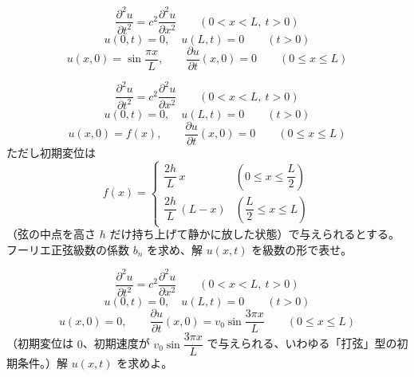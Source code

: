 \documentclass[a4paper,11pt]{article}
\begin{document}


\[
\frac{\partial^{2} u}{\partial t^{2}} = c^{2}\frac{\partial^{2} u}{\partial x^{2}} \qquad (0 < x < L,\ t > 0)
\]
\[
u(0,t) = 0,\quad u(L,t) = 0 \qquad (t > 0)
\]
\[
u(x,0) = \sin\frac{\pi x}{L}, \qquad \frac{\partial u}{\partial t}(x,0) = 0 \qquad (0 \le x \le L)
\]

\[
\frac{\partial^{2} u}{\partial t^{2}} = c^{2}\frac{\partial^{2} u}{\partial x^{2}} \qquad (0 < x < L,\ t > 0)
\]
\[
u(0,t) = 0,\quad u(L,t) = 0 \qquad (t > 0)
\]
\[
u(x,0) = f(x), \qquad \frac{\partial u}{\partial t}(x,0) = 0 \qquad (0 \le x \le L)
\]
ただし初期変位は
\[
f(x) =
\begin{cases}
\dfrac{2h}{L}\,x & \left(0 \le x \le \dfrac{L}{2}\right) \\[2mm]
\dfrac{2h}{L}\,(L-x) & \left(\dfrac{L}{2} \le x \le L\right)
\end{cases}
\]
（弦の中点を高さ $h$ だけ持ち上げて静かに放した状態）で与えられるとする。フーリエ正弦級数の係数 $b_{n}$ を求め、解 $u(x,t)$ を級数の形で表せ。

\[
\frac{\partial^{2} u}{\partial t^{2}} = c^{2}\frac{\partial^{2} u}{\partial x^{2}} \qquad (0 < x < L,\ t > 0)
\]
\[
u(0,t) = 0,\quad u(L,t) = 0 \qquad (t > 0)
\]
\[
u(x,0) = 0, \qquad \frac{\partial u}{\partial t}(x,0) = v_{0}\sin\frac{3\pi x}{L} \qquad (0 \le x \le L)
\]
（初期変位は $0$、初期速度が $v_{0}\sin\dfrac{3\pi x}{L}$ で与えられる、いわゆる「打弦」型の初期条件。）解 $u(x,t)$ を求めよ。
\end{document}
